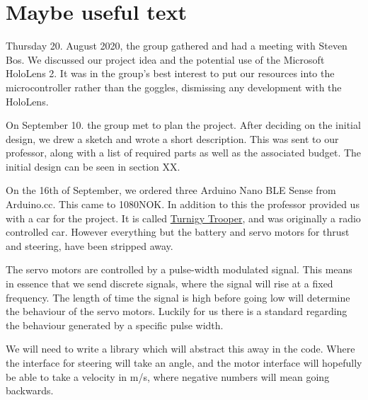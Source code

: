 \documentclass{article}
\begin{document}
\maketitle

\section{Maybe useful text}

Thursday 20. August 2020, the group gathered and had a meeting with Steven Bos. We discussed our project idea and the potential use of the Microsoft HoloLens 2. It was in the group's best interest to put our resources into the microcontroller rather than the goggles, dismissing any development with the HoloLens.

\vspace{5mm}
On September 10. the group met to plan the project. After deciding on the initial design, we drew a sketch and wrote a short description. This was sent to our professor, along with a list of required parts as well as the associated budget. The initial design can be seen in section XX.

\vspace{5mm}

On the 16th of September, we ordered three Arduino Nano BLE Sense from Arduino.cc. This came to 1080NOK. In addition to this the professor provided us with a car for the project. It is called \href{https://hobbyking.com/en_us/turnigy-trooper-sct-4x4-1-10-brushless-short-course-truck-arr.html?___store=en_us}{Turnigy Trooper}, and was originally a radio controlled car. However everything but the battery and servo motors for thrust and steering, have been stripped away. 

The servo motors are controlled by a pulse-width modulated signal. This means in essence that we send discrete signals, where the signal will rise at a fixed frequency. The length of time the signal is high before going low will determine the behaviour of the servo motors. Luckily for us there is a standard regarding the behaviour generated by a specific pulse width. 

We will need to write a library which will abstract this away in the code. Where the interface for steering will take an angle, and the motor interface will hopefully be able to take a velocity in m/s, where negative numbers will mean going backwards. 






\vspace{5mm}
\end{document}
